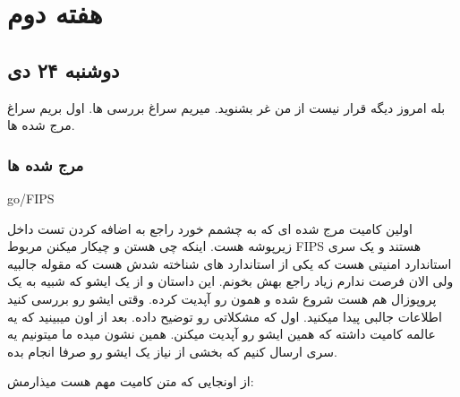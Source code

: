
\section{هفته دوم}
\subsection{دوشنبه ۲۴ دی}
بله امروز دیگه قرار نیست از من غر بشنوید. میریم سراغ بررسی \cl ها.
اول بریم سراغ مرج شده ها.

\subsubsection{مرج شده ها}
{\LARGE go/FIPS}

اولین کامیت مرج شده ای که به چشمم خورد
راجع به اضافه کردن تست داخل زیرپوشه  هست. اینکه چی هستن و چیکار میکنن مربوط FIPS
هستند و یک سری استاندارد امنیتی هست که یکی از استاندارد های شناخته شدش  هست
که مقوله جالبیه ولی الان فرصت ندارم زیاد راجع بهش بخونم. این داستان و \cl از یک ایشو که شبیه به یک پروپوزال هم هست شروع شده
و همون رو آپدیت کرده. وقتی ایشو رو بررسی کنید اطلاعات جالبی پیدا میکنید. اول که مشکلاتی رو توضیح داده. بعد از اون میبینید که یه عالمه
کامیت داشته که همین ایشو رو آپدیت میکنن. همین نشون میده ما میتونیم یه سری \cl ارسال کنیم که بخشی از نیاز یک ایشو رو صرفا انجام بده.

از اونجایی که متن کامیت مهم هست میذارمش:


